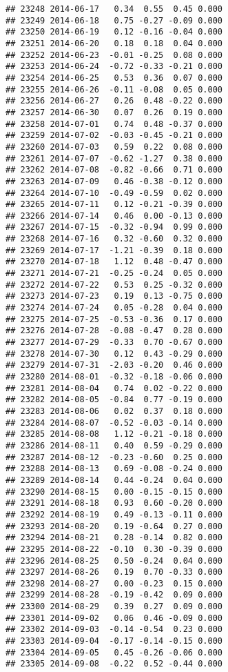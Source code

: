 \documentclass[
]{article}
\begin{document}
\begin{verbatim}
## 23248 2014-06-17   0.34  0.55  0.45 0.000
## 23249 2014-06-18   0.75 -0.27 -0.09 0.000
## 23250 2014-06-19   0.12 -0.16 -0.04 0.000
## 23251 2014-06-20   0.18  0.18  0.04 0.000
## 23252 2014-06-23  -0.01 -0.25  0.08 0.000
## 23253 2014-06-24  -0.72 -0.33 -0.21 0.000
## 23254 2014-06-25   0.53  0.36  0.07 0.000
## 23255 2014-06-26  -0.11 -0.08  0.05 0.000
## 23256 2014-06-27   0.26  0.48 -0.22 0.000
## 23257 2014-06-30   0.07  0.26  0.19 0.000
## 23258 2014-07-01   0.74  0.48 -0.37 0.000
## 23259 2014-07-02  -0.03 -0.45 -0.21 0.000
## 23260 2014-07-03   0.59  0.22  0.08 0.000
## 23261 2014-07-07  -0.62 -1.27  0.38 0.000
## 23262 2014-07-08  -0.82 -0.66  0.71 0.000
## 23263 2014-07-09   0.46 -0.38 -0.12 0.000
## 23264 2014-07-10  -0.49 -0.59  0.02 0.000
## 23265 2014-07-11   0.12 -0.21 -0.39 0.000
## 23266 2014-07-14   0.46  0.00 -0.13 0.000
## 23267 2014-07-15  -0.32 -0.94  0.99 0.000
## 23268 2014-07-16   0.32 -0.60  0.32 0.000
## 23269 2014-07-17  -1.21 -0.39  0.18 0.000
## 23270 2014-07-18   1.12  0.48 -0.47 0.000
## 23271 2014-07-21  -0.25 -0.24  0.05 0.000
## 23272 2014-07-22   0.53  0.25 -0.32 0.000
## 23273 2014-07-23   0.19  0.13 -0.75 0.000
## 23274 2014-07-24   0.05 -0.28  0.04 0.000
## 23275 2014-07-25  -0.53 -0.36  0.17 0.000
## 23276 2014-07-28  -0.08 -0.47  0.28 0.000
## 23277 2014-07-29  -0.33  0.70 -0.67 0.000
## 23278 2014-07-30   0.12  0.43 -0.29 0.000
## 23279 2014-07-31  -2.03 -0.20  0.46 0.000
## 23280 2014-08-01  -0.32 -0.18 -0.06 0.000
## 23281 2014-08-04   0.74  0.02 -0.22 0.000
## 23282 2014-08-05  -0.84  0.77 -0.19 0.000
## 23283 2014-08-06   0.02  0.37  0.18 0.000
## 23284 2014-08-07  -0.52 -0.03 -0.14 0.000
## 23285 2014-08-08   1.12 -0.21 -0.18 0.000
## 23286 2014-08-11   0.40  0.59 -0.29 0.000
## 23287 2014-08-12  -0.23 -0.60  0.25 0.000
## 23288 2014-08-13   0.69 -0.08 -0.24 0.000
## 23289 2014-08-14   0.44 -0.24  0.04 0.000
## 23290 2014-08-15   0.00 -0.15 -0.15 0.000
## 23291 2014-08-18   0.93  0.60 -0.20 0.000
## 23292 2014-08-19   0.49 -0.13 -0.11 0.000
## 23293 2014-08-20   0.19 -0.64  0.27 0.000
## 23294 2014-08-21   0.28 -0.14  0.82 0.000
## 23295 2014-08-22  -0.10  0.30 -0.39 0.000
## 23296 2014-08-25   0.50 -0.24  0.04 0.000
## 23297 2014-08-26   0.19  0.70 -0.33 0.000
## 23298 2014-08-27   0.00 -0.23  0.15 0.000
## 23299 2014-08-28  -0.19 -0.42  0.09 0.000
## 23300 2014-08-29   0.39  0.27  0.09 0.000
## 23301 2014-09-02   0.06  0.46 -0.09 0.000
## 23302 2014-09-03  -0.14 -0.54  0.23 0.000
## 23303 2014-09-04  -0.17 -0.14 -0.15 0.000
## 23304 2014-09-05   0.45 -0.26 -0.06 0.000
## 23305 2014-09-08  -0.22  0.52 -0.44 0.000

\end{verbatim}
\end{document}
